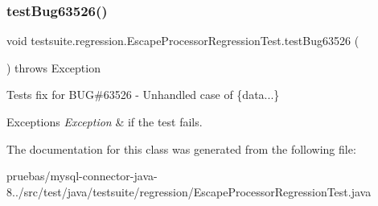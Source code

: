 \subsubsection{\texorpdfstring{test\+Bug63526()}{testBug63526()}}
{\footnotesize\ttfamily void testsuite.\+regression.\+Escape\+Processor\+Regression\+Test.\+test\+Bug63526 (\begin{DoxyParamCaption}{ }\end{DoxyParamCaption}) throws Exception}

Tests fix for B\+UG\#63526 -\/ Unhandled case of \{data...\}


\begin{DoxyExceptions}{Exceptions}
{\em Exception} & if the test fails. \\
\hline
\end{DoxyExceptions}


The documentation for this class was generated from the following file\+:\begin{DoxyCompactItemize}
\item 
pruebas/mysql-\/connector-\/java-\/8../src/test/java/testsuite/regression/Escape\+Processor\+Regression\+Test.\+java\end{DoxyCompactItemize}

